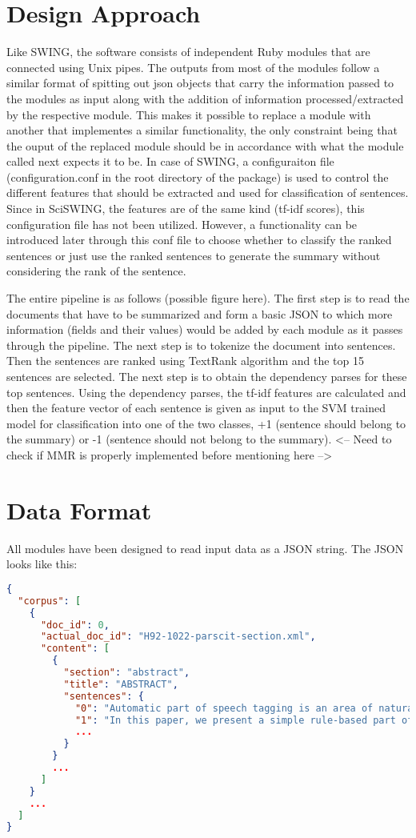 \documentclass[12pt]{scrreprt}
\begin{document}
\chapter{Design Approach}
Like SWING, the software consists of independent Ruby modules that are connected using Unix pipes.
The outputs from most of the modules follow a similar format of spitting out json objects that carry the information passed to the modules as input along with the addition of information processed/extracted by the respective module.
This makes it possible to replace a module with another that implementes a similar functionality, the only constraint being that the ouput of the replaced module should be in accordance with what the module called next expects it to be.
In case of SWING, a configuraiton file (configuration.conf in the root directory of the package) is used to control the different features that should be extracted and used for classification of sentences.
Since in SciSWING, the features are of the same kind (tf-idf scores), this configuration file has not been utilized.
However, a functionality can be introduced later through this conf file to choose whether to classify the ranked sentences or just use the ranked sentences to generate the summary without considering the rank of the sentence.

The entire pipeline is as follows (possible figure here).
The first step is to read the documents that have to be summarized and form a basic JSON to which more information (fields and their values) would be added by each module as it passes through the pipeline.
The next step is to tokenize the document into sentences.
Then the sentences are ranked using TextRank algorithm and the top 15 sentences are selected.
The next step is to obtain the dependency parses for these top sentences.
Using the dependency parses, the tf-idf features are calculated and then the feature vector of each sentence is given as input to the SVM trained model for classification into one of the two classes, +1 (sentence should belong to the summary) or -1 (sentence should not belong to the summary).
<-- Need to check if MMR is properly implemented before mentioning here -->
\chapter{Data Format}
All modules have been designed to read input data as a JSON string.
The JSON looks like this:
\begin{lstlisting}[language=json]
{
  "corpus": [
    {
      "doc_id": 0,
      "actual_doc_id": "H92-1022-parscit-section.xml",
      "content": [
        {
          "section": "abstract",
          "title": "ABSTRACT",
          "sentences": {
            "0": "Automatic part of speech tagging is an area of natural language processing ...",
            "1": "In this paper, we present a simple rule-based part of speech tagger ...",
            ...
          }
        }
        ...
      ]
    }
    ...
  ]
}
\end{lstlisting}
\end{document}
